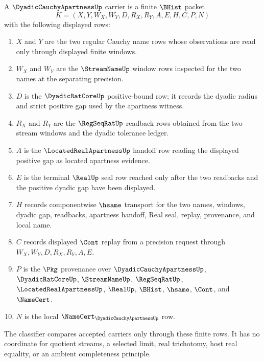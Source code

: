 \begin{definition}
\label{def:dyadic-cauchy-apartness-carrier}
A $\DyadicCauchyApartnessUp$ carrier is a finite $\BHist$ packet
$$
K=(X,Y,W_X,W_Y,D,R_X,R_Y,A,E,H,C,P,N)
$$
with the following displayed rows:
\begin{enumerate}
\item $X$ and $Y$ are the two regular Cauchy name rows whose observations are read only through displayed finite windows.
\item $W_X$ and $W_Y$ are the $\StreamNameUp$ window rows inspected for the two names at the separating precision.
\item $D$ is the $\DyadicRatCoreUp$ positive-bound row; it records the dyadic radius and strict positive gap used by the apartness witness.
\item $R_X$ and $R_Y$ are the $\RegSeqRatUp$ readback rows obtained from the two stream windows and the dyadic tolerance ledger.
\item $A$ is the $\LocatedRealApartnessUp$ handoff row reading the displayed positive gap as located apartness evidence.
\item $E$ is the terminal $\RealUp$ seal row reached only after the two readbacks and the positive dyadic gap have been displayed.
\item $H$ records componentwise $\hsame$ transport for the two names, windows, dyadic gap, readbacks, apartness handoff, Real seal, replay, provenance, and local name.
\item $C$ records displayed $\Cont$ replay from a precision request through $W_X,W_Y,D,R_X,R_Y,A,E$.
\item $P$ is the $\Pkg$ provenance over $\DyadicCauchyApartnessUp$, $\DyadicRatCoreUp$, $\StreamNameUp$, $\RegSeqRatUp$, $\LocatedRealApartnessUp$, $\RealUp$, $\BHist$, $\hsame$, $\Cont$, and $\NameCert$.
\item $N$ is the local $\NameCert_{\DyadicCauchyApartnessUp}$ row.
\end{enumerate}
The classifier compares accepted carriers only through these finite rows. It has no coordinate for quotient streams, a selected limit, real trichotomy, host real equality, or an ambient completeness principle.
\end{definition}

